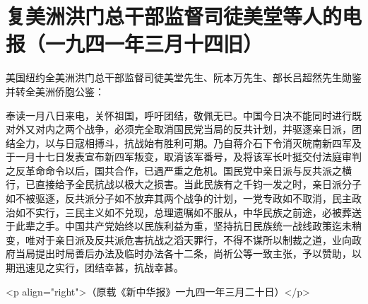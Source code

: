 \section[复美洲洪门总干部监督司徒美堂等人的电报（一九四一年三月十四旧）]{复美洲洪门总干部监督司徒美堂等人的电报（一九四一年三月十四旧）}


美国纽约全美洲洪门总干部监督司徒美堂先生、阮本万先生、部长吕超然先生勋鉴并转全美洲侨胞公鉴：

奉读一月八日来电，关怀祖国，呼吁团结，敬佩无已。中国今日决不能同时进行既对外又对内之两个战争，必须完全取消国民党当局的反共计划，并驱逐亲日派，团结全力，以与日寇相搏斗，抗战始有胜利可期。乃自蒋介石下令消灭皖南新四军及于一月十七日发表宣布新四军叛变，取消该军番号，及将该军长叶挺交付法庭审判之反革命命令以后，国共合作，已遇严重之危机。国民党中亲日派与反共派之横行，已直接给予全民抗战以极大之损害。当此民族有之千钧一发之时，亲日派分子如不被驱逐，反共派分子如不放弃其两个战争的计划，一党专政如不取消，民主政治如不实行，三民主义如不兑现，总理遗嘱如不服从，中华民族之前途，必被葬送于此辈之手。中国共产党始终以民族利益为重，坚持抗日民族统一战线政策迄未稍变，唯对于亲日派及反共派危害抗战之滔天罪行，不得不谋所以制裁之道，业向政府当局提出时局善后办法及临时办法各十二条，尚祈公等一致主张，予以赞助，以期迅速见之实行，团结幸甚，抗战幸甚。

<p align="right">（原载《新中华报》一九四一年三月二十日）</p>

